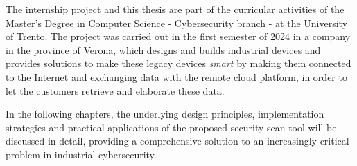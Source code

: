 The internship project and this thesis are part of the curricular activities of the Master's Degree in Computer Science - Cybersecurity branch - at the University of Trento. The project was carried out in the first semester of 2024 in a company in the province of Verona, which designs and builds industrial devices and provides solutions to make these legacy devices \textit{smart} by making them connected to the Internet and exchanging data with the remote cloud platform, in order to let the customers retrieve and elaborate these data.

In the following chapters, the underlying design principles, implementation strategies and practical applications of the proposed security scan tool will be discussed in detail, providing a comprehensive solution to an increasingly critical problem in industrial cybersecurity.
